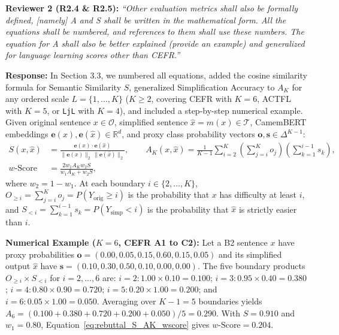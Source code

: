 \documentclass[11pt,a4paper]{article}
\begin{document}
\begin{reviewbox}
\textbf{Reviewer 2 (R2.4 \& R2.5):} \textit{``Other evaluation metrics shall also be formally defined, [namely] A and S shall be written in the mathematical form. All the equations shall be numbered, and references to them shall use these numbers. The equation for A shall also be better explained (provide an example) and generalized for language learning scores other than CEFR.''}
\end{reviewbox}

\noindent\textbf{Response:}
In Section 3.3, we numbered all equations, added the cosine similarity formula for Semantic Similarity $S$, generalized Simplification Accuracy to $A_K$ for any ordered scale $L = \{1, \dots, K\}$ ($K \ge 2$, covering CEFR with $K=6$, ACTFL with $K=5$, or \texttt{LjL} with $K=4$), and included a step-by-step numerical example. Given original sentence $x \in \mathcal{O}$, simplified sentence $\hat{x} = m(x) \in \mathcal{T}$, CamemBERT embeddings $\mathbf{e}(x), \mathbf{e}(\hat{x}) \in \mathbb{R}^d$, and proxy class probability vectors $\mathbf{o}, \mathbf{s} \in \Delta^{K-1}$:
\begin{equation}\label{eq:rebuttal_S_AK_wscore}
\begin{aligned}
S(x, \hat{x}) &= \frac{\mathbf{e}(x) \cdot \mathbf{e}(\hat{x})}{\|\mathbf{e}(x)\|_2 \, \|\mathbf{e}(\hat{x})\|_2}, \qquad
A_K(x, \hat{x}) = \frac{1}{K - 1} \sum_{i=2}^{K} \left( \sum_{j=i}^{K} o_j \right) \left( \sum_{k=1}^{i-1} s_k \right), \\
w\text{-Score} &= \frac{2 w_1 A_K w_2 S}{w_1 A_K + w_2 S},
\end{aligned}
\end{equation}
where $w_2 = 1 - w_1$. At each boundary $i \in \{2, \dots, K\}$, $O_{\ge i} = \sum_{j=i}^{K} o_j = P(Y_{\text{orig}} \ge i)$ is the probability that $x$ has difficulty at least $i$, and $S_{< i} = \sum_{k=1}^{i-1} s_k = P(Y_{\text{simp}} < i)$ is the probability that $\hat{x}$ is strictly easier than $i$.

\noindent\textbf{Numerical Example ($K = 6$, CEFR A1 to C2):} Let a B2 sentence $x$ have proxy probabilities $\mathbf{o} = (0.00, 0.05, 0.15, 0.60, 0.15, 0.05)$ and its simplified output $\hat{x}$ have $\mathbf{s} = (0.10, 0.30, 0.50, 0.10, 0.00, 0.00)$. The five boundary products $O_{\ge i} \times S_{< i}$ for $i = 2, \dots, 6$ are: $i=2: 1.00 \times 0.10 = 0.100$; $i=3: 0.95 \times 0.40 = 0.380$; $i=4: 0.80 \times 0.90 = 0.720$; $i=5: 0.20 \times 1.00 = 0.200$; and $i=6: 0.05 \times 1.00 = 0.050$. Averaging over $K-1 = 5$ boundaries yields $A_6 = (0.100 + 0.380 + 0.720 + 0.200 + 0.050)/5 = 0.290$. With $S = 0.910$ and $w_1 = 0.80$, Equation~\ref{eq:rebuttal_S_AK_wscore} gives $w\text{-Score} = 0.204$.
\end{document}
